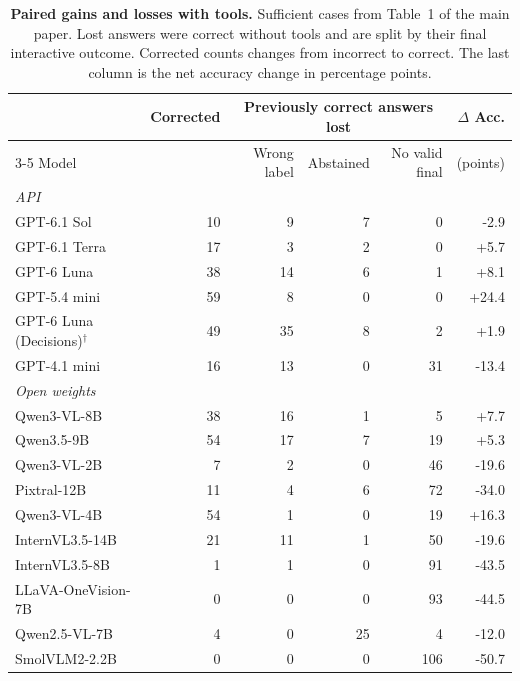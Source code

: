 \begin{table}[t]\centering\small\setlength{\tabcolsep}{5pt}
\begin{minipage}{.94\textwidth}\centering
\caption{\textbf{Paired gains and losses with tools.} Sufficient cases from Table~1 of the main paper. Lost answers were correct without tools and are split by their final interactive outcome. Corrected counts changes from incorrect to correct. The last column is the net accuracy change in percentage points.}
\label{tab:tool-regressions}
\begin{tabular}{@{}lrrrrr@{}}\toprule
 & Corrected & \multicolumn{3}{c}{Previously correct answers lost} & $\Delta$ Acc.\\
\cmidrule(lr){3-5}
Model & & Wrong label & Abstained & No valid final & (points)\\\midrule
\multicolumn{6}{l}{\emph{API}}\\
GPT-6.1 Sol & 10 & 9 & 7 & 0 & -2.9\\
GPT-6.1 Terra & 17 & 3 & 2 & 0 & +5.7\\
GPT-6 Luna & 38 & 14 & 6 & 1 & +8.1\\
GPT-5.4 mini & 59 & 8 & 0 & 0 & +24.4\\
GPT-6 Luna (Decisions)$^{\dagger}$ & 49 & 35 & 8 & 2 & +1.9\\
GPT-4.1 mini & 16 & 13 & 0 & 31 & -13.4\\
\midrule
\multicolumn{6}{l}{\emph{Open weights}}\\
Qwen3-VL-8B & 38 & 16 & 1 & 5 & +7.7\\
Qwen3.5-9B & 54 & 17 & 7 & 19 & +5.3\\
Qwen3-VL-2B & 7 & 2 & 0 & 46 & -19.6\\
Pixtral-12B & 11 & 4 & 6 & 72 & -34.0\\
Qwen3-VL-4B & 54 & 1 & 0 & 19 & +16.3\\
InternVL3.5-14B & 21 & 11 & 1 & 50 & -19.6\\
InternVL3.5-8B & 1 & 1 & 0 & 91 & -43.5\\
LLaVA-OneVision-7B & 0 & 0 & 0 & 93 & -44.5\\
Qwen2.5-VL-7B & 4 & 0 & 25 & 4 & -12.0\\
SmolVLM2-2.2B & 0 & 0 & 0 & 106 & -50.7\\
\bottomrule\end{tabular}\end{minipage}\end{table}
